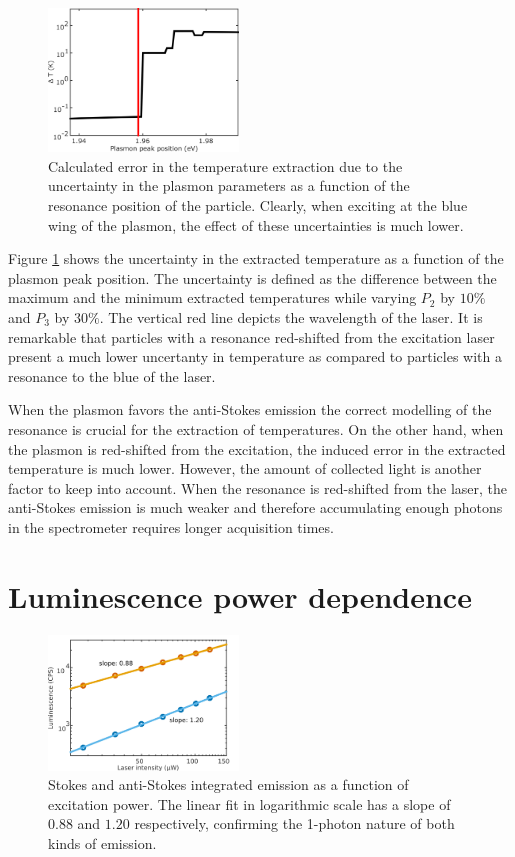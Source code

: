 \documentclass[journal=nalefd,manuscript=letter]{achemso}
\begin{document}
\begin{figure}[htp] \centering
\includegraphics[width=0.45\textwidth]{Figures/Supplementary/06_Calculation_error/06_calculation_error.png}
\caption{Calculated error in the temperature extraction due to the uncertainty in the plasmon parameters as a function of the resonance position of the particle. Clearly, when exciting at the blue wing of the plasmon, the effect of these uncertainties is much lower.}
	\label{fig:calculated-error}
\end{figure}

Figure \ref{fig:calculated-error} shows the uncertainty in the extracted temperature as a function of the plasmon peak position. The uncertainty is defined as the difference between the maximum and the minimum extracted temperatures while varying $P_2$ by $10\%$ and $P_3$ by $30\%$. The vertical red line depicts the wavelength of the laser. It is remarkable that particles with a resonance red-shifted from the excitation laser present a much lower uncertanty in temperature as compared to particles with a resonance to the blue of the laser.

When the plasmon favors the anti-Stokes emission the correct modelling of the resonance is crucial for the extraction of temperatures. On the other hand, when the plasmon is red-shifted from the excitation, the induced error in the extracted temperature is much lower. However, the amount of collected light is another factor to keep into account. When the resonance is red-shifted from the laser, the anti-Stokes emission is much weaker and therefore accumulating enough photons in the spectrometer requires longer acquisition times. 

\section{Luminescence power dependence}

\begin{figure}[htp] \centering
\includegraphics[width=0.45\textwidth]{Figures/Supplementary/03_AS_S_in_Log/03_AS_S_in_Log.png}
\caption{Stokes and anti-Stokes integrated emission as a function of excitation power. The
linear fit in logarithmic scale has a slope of $0.88$ and $1.20$ respectively,
confirming the 1-photon nature of both kinds of emission.}
	\label{fig:Log_Plot}
\end{figure}
\end{document}
